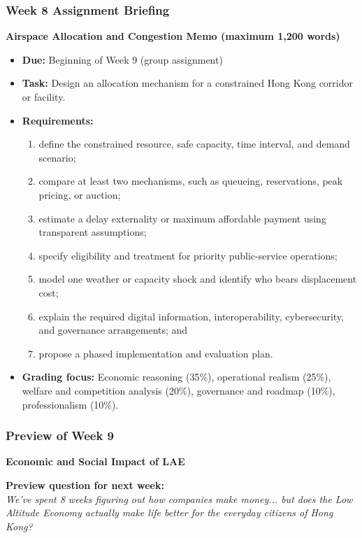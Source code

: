 \documentclass{beamer}
\begin{document}
\begin{frame}[t]
\frametitle{Week 8 Assignment Briefing}
\textbf{Airspace Allocation and Congestion Memo (maximum 1,200 words)}
\begin{itemize}
\item \textbf{Due:} Beginning of Week 9 (group assignment)
\item \textbf{Task:} Design an allocation mechanism for a constrained Hong Kong corridor or facility.
\item \textbf{Requirements:}
\begin{enumerate}
\item define the constrained resource, safe capacity, time interval, and demand scenario;
\item compare at least two mechanisms, such as queueing, reservations, peak pricing, or auction;
\item estimate a delay externality or maximum affordable payment using transparent assumptions;
\item specify eligibility and treatment for priority public-service operations;
\item model one weather or capacity shock and identify who bears displacement cost;
\item explain the required digital information, interoperability, cybersecurity, and governance arrangements; and
\item propose a phased implementation and evaluation plan.
\end{enumerate}
\item \textbf{Grading focus:} Economic reasoning (35\%), operational realism (25\%), welfare and competition analysis (20\%), governance and roadmap (10\%), professionalism (10\%).
\end{itemize}
\end{frame}

\begin{frame}[t]
  \frametitle{Preview of Week 9}
  
  \begin{center}
      \Large \textbf{Economic and Social Impact of LAE}
  \end{center}
  
  \vspace{1cm}
  \textbf{Preview question for next week:} \\
  \textit{We've spent 8 weeks figuring out how companies make money... but does the Low Altitude Economy actually make life better for the everyday citizens of Hong Kong?}
\end{frame}
\end{document}
